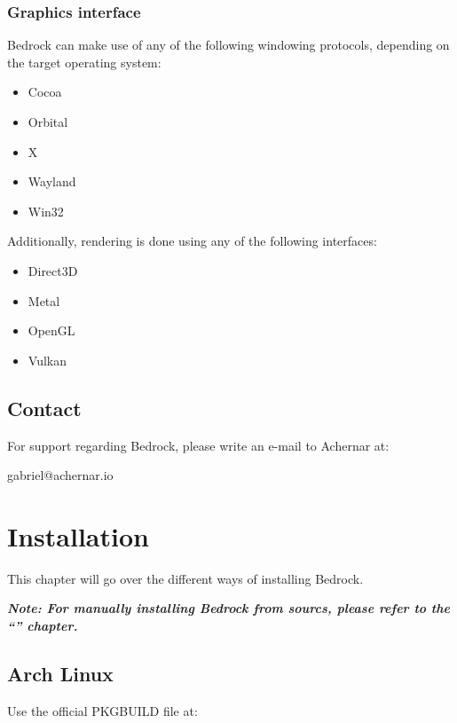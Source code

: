 \documentclass[a5paper, twoside]{report}
\begin{document}
			\subsection{Graphics interface}
				Bedrock can make use of any of the following windowing protocols, depending on the target operating system:

				\begin{multicols}{2}
					\begin{itemize}
						\item{Cocoa}
						\item{Orbital}
						\item{X}
						\item{Wayland}
						\item{Win32}
					\end{itemize}
				\end{multicols}

				Additionally, rendering is done using any of the following interfaces:

				\begin{multicols}{2}
					\begin{itemize}
						\item{Direct3D}
						\item{Metal}
						\item{OpenGL}
						\item{Vulkan}
					\end{itemize}
				\end{multicols}

		\section{Contact}
			For support regarding Bedrock, please write an e-mail to Achernar at:

			\begin{mdframed}
				\ttfamily
				gabriel@achernar.io
			\end{mdframed}

	\clearpage
	\chapter{Installation}
		\label{install}
		This chapter will go over the different ways of installing Bedrock.

		{\small\itshape\bfseries Note: For manually installing Bedrock from sourcs, please refer to the ``'' chapter.}

		\section{Arch Linux}
			\label{install:arch}
			Use the official PKGBUILD file at:
\end{document}
